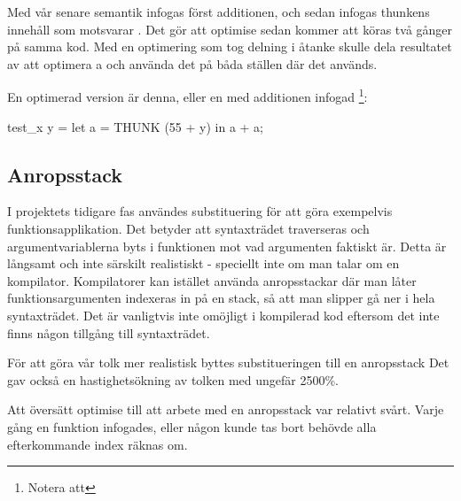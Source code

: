 \documentclass[Rapport]{subfiles}
\begin{document}
Med vår senare semantik infogas först additionen, och sedan infogas thunkens innehåll
som motsvarar . Det gör att optimise sedan kommer att
köras två gånger på samma kod. Med en optimering som tog delning i åtanke 
skulle dela resultatet av att optimera a och använda det på båda ställen där det används.

En optimerad version är denna, eller en med additionen infogad
\footnote{Notera att }:

\begin{codeEx}
test_x y = let
    { a = THUNK (55 + y)
    } in a + a;
\end{codeEx}

\subsection{Anropsstack}

I projektets tidigare fas användes substituering för att göra exempelvis funktionsapplikation.
Det betyder att syntaxträdet traverseras och argumentvariablerna byts i funktionen
mot vad argumenten faktiskt är. Detta är långsamt och inte särskilt realistiskt - 
speciellt inte om man talar om en kompilator. Kompilatorer kan istället använda anropsstackar
där man låter funktionsargumenten indexeras in på en stack, så att man slipper
gå ner i hela syntaxträdet. Det är vanligtvis inte omöjligt i kompilerad kod eftersom
det inte finns någon tillgång till syntaxträdet.

För att göra vår tolk mer realistisk byttes substitueringen till en anropsstack 
Det gav också en hastighetsökning av tolken med ungefär 2500\%.


Att översätt optimise till att arbete med en anropsstack var relativt svårt. Varje gång en funktion infogades, eller någon  kunde tas bort behövde alla efterkommande index räknas om. 
\end{document}
